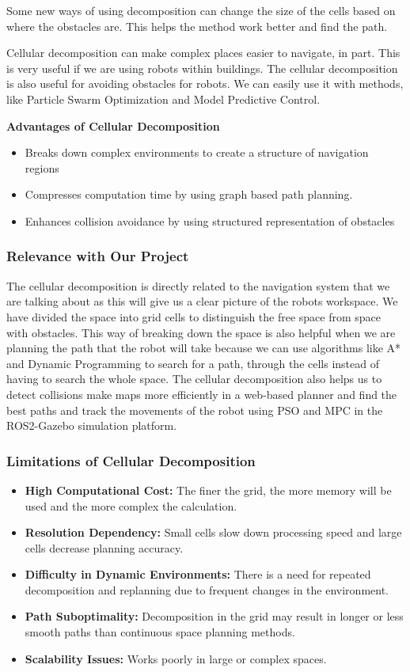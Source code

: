 Some new ways of using decomposition can change the size of the cells based on where the obstacles are. This helps the method work better and find the path.

Cellular decomposition can make complex places easier to navigate, in part. This is very useful if we are using robots within buildings. The cellular decomposition is also useful for avoiding obstacles for robots. We can easily use it with methods, like Particle Swarm Optimization and Model Predictive Control.

\textbf{Advantages of Cellular Decomposition}

\begin{itemize}
\item Breaks down complex environments to create a structure of navigation regions
\item Compresses computation time by using graph based path planning.
\item Enhances collision avoidance by using structured representation of obstacles
\end{itemize}

\subsubsection{Relevance with Our Project}
The cellular decomposition is directly related to the navigation system that we are talking about as this will give us a clear picture of the robots workspace. We have divided the space into grid cells to distinguish the free space from space with obstacles. This way of breaking down the space is also helpful when we are planning the path that the robot will take because we can use algorithms like A* and Dynamic Programming to search for a path, through the cells instead of having to search the whole space. The cellular decomposition also helps us to detect collisions make maps more efficiently in a web-based planner and find the best paths and track the movements of the robot using PSO and MPC in the ROS2-Gazebo simulation platform.

\subsubsection{Limitations of Cellular Decomposition}

\begin{itemize}
\item \textbf{High Computational Cost:} The finer the grid, the more memory will be used and the more complex the calculation.
\item \textbf{Resolution Dependency:} Small cells slow down processing speed and large cells decrease planning accuracy.
\item \textbf{Difficulty in Dynamic Environments:} There is a need for repeated decomposition and replanning due to frequent changes in the environment.
\item \textbf{Path Suboptimality:} Decomposition in the grid may result in longer or less smooth paths than continuous space planning methods.
\item \textbf{Scalability Issues:} Works poorly in large or complex spaces.
\end{itemize}

